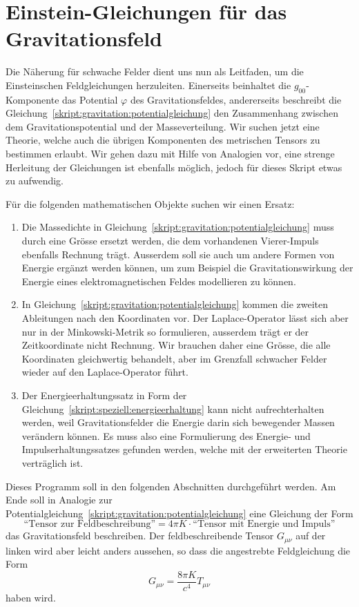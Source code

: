 \section{Einstein-Gleichungen für das Gravitationsfeld%
\label{skript:gravitation:section:einsteingl}}
Die Näherung für schwache Felder dient uns nun als Leitfaden, um die
Einsteinschen Feldgleichungen herzuleiten.
Einerseits beinhaltet die $g_{00}$-Komponente das Potential $\varphi$ des
Gravitationsfeldes, andererseits beschreibt die
Gleichung~\eqref{skript:gravitation:potentialgleichung}
den Zusammenhang zwischen dem Gravitationspotential und der
Masseverteilung.
Wir suchen jetzt eine Theorie, welche auch die übrigen Komponenten
des metrischen Tensors zu bestimmen erlaubt.
Wir gehen dazu mit Hilfe von Analogien vor, eine strenge Herleitung
der Gleichungen ist ebenfalls möglich, jedoch für dieses Skript etwas
zu aufwendig.


Für die folgenden mathematischen Objekte suchen wir einen Ersatz:
\begin{enumerate}
\item
Die Massedichte in 
Gleichung~\eqref{skript:gravitation:potentialgleichung}
muss durch eine Grösse ersetzt werden, die dem vorhandenen Vierer-Impuls
ebenfalls Rechnung trägt.
Ausserdem soll sie auch um andere Formen von Energie ergänzt werden 
können, um zum Beispiel die Gravitationswirkung der Energie eines
elektromagnetischen Feldes modellieren zu können.
\item
In Gleichung~\eqref{skript:gravitation:potentialgleichung}
kommen die zweiten Ableitungen nach den Koordinaten vor. 
Der Laplace-Operator lässt sich aber nur in der Minkowski-Metrik so 
formulieren, ausserdem trägt er der Zeitkoordinate nicht Rechnung.
Wir brauchen daher eine Grösse, die alle Koordinaten gleichwertig
behandelt, aber im Grenzfall schwacher Felder wieder auf den 
Laplace-Operator führt.
\item
Der Energieerhaltungssatz in Form der
Gleichung~\eqref{skript:speziell:energieerhaltung}
kann nicht aufrechterhalten werden, weil
Gravitationsfelder die Energie darin sich bewegender Massen verändern
können.
Es muss also eine Formulierung des Energie- und Impulserhaltungssatzes
gefunden werden, welche mit der erweiterten Theorie verträglich ist.
\end{enumerate}
Dieses Programm soll in den folgenden Abschnitten durchgeführt werden.
Am Ende soll in Analogie zur 
Potentialgleichung~\eqref{skript:gravitation:potentialgleichung}
eine Gleichung der Form
\[
\text{``Tensor zur Feldbeschreibung''}
=
4\pi K\cdot \text{``Tensor mit Energie und Impuls''}
\]
das Gravitationsfeld beschreiben.
Der feldbeschreibende Tensor $G_{\mu\nu}$ auf der linken wird aber leicht
anders aussehen, so dass die angestrebte Feldgleichung die Form
\[
G_{\mu\nu}
=
\frac{8\pi K}{c^4} T_{\mu\nu}
\]
haben wird.

